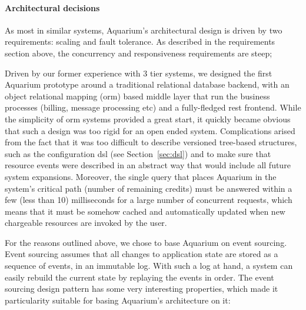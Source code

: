 \paragraph{Architectural decisions} As most in similar systems, Aquarium's architectural design is driven by two 
requirements: scaling and fault tolerance. As described in the requirements
section above, the concurrency and responsiveness requirements are steep;

Driven by our former experience with 3 tier systems, we designed the first
Aquarium prototype around a traditional relational database backend, with an
object relational mapping ({\sc orm}) based middle layer that run the business
processes (billing, message processing etc) and a fully-fledged {\sc rest}
frontend. While the simplicity of {\sc orm} systems provided a great start,
it quickly became obvious that such a design was too rigid for an open 
ended system. Complications arised from the fact that it was too difficult
to describe versioned tree-based structures, such as the configuration {\sc dsl} 
(see Section~\ref{sec:dsl}) and to make sure that resource events were
described in an abstract way that would include all future system expansions.
Moreover, the single query that places Aquarium in the system's critical 
path (number of remaining credits) must be answered within a few (less than
10) milliseconds for a large number of concurrent requests, which means that
it must be somehow cached and automatically updated when new chargeable 
resources are invoked by the user.

For the reasons outlined above, we chose to base Aquarium on event sourcing. 
Event sourcing assumes that all changes to application
state are stored as a sequence of events, in an immutable log. With such a log
at hand, a system can easily rebuild the current state by replaying the events
in order. The event sourcing design pattern has some very interesting
properties, which made it particularity suitable for basing Aquarium's
architecture on it:

